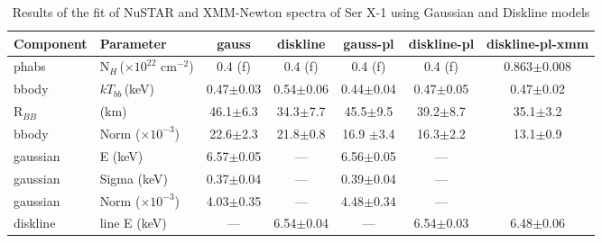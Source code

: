 \documentclass{aa}
\begin{document}
\begin{table*}
\caption{Results of the fit of NuSTAR and XMM-Newton spectra of Ser X-1 using Gaussian and Diskline models \label{tab:fit_1}}             
  
  
    
\centering          
\scriptsize


\begin{tabular}{llccccc}     %
\hline\hline       

Component &
Parameter &



gauss &
diskline&
gauss-pl &
diskline-pl &
diskline-pl-xmm\\





\hline
phabs & 
N$_{H}\,$($\times10^{22}$ cm$^{-2}$) & 
0.4 (f) &
0.4 (f) &
0.4 (f) &
0.4 (f) &
0.863$\pm$0.008  \\




bbody & 
$kT_{bb}\,$(keV) & 
0.47$\pm$0.03 &
0.54$\pm$0.06  & 
0.44$\pm$0.04 &
0.47$\pm$0.05 & 
0.47$\pm$0.02\\

R$_{BB}$&
 (km)  &  
46.1$\pm$6.3 &
34.3$\pm$7.7&
45.5$\pm$9.5 &
39.2$\pm$8.7 &
35.1$\pm$3.2 \\


bbody & 
Norm ($\times10^{-3}$) &  
22.6$\pm$2.3 &
21.8$\pm$0.8 &
16.9 $\pm$3.4 &
16.3$\pm$2.2 &
13.1$\pm$0.9\\


\hline


gaussian & 
E (keV)   & 
6.57$\pm$0.05 &
--- &
6.56$\pm$0.05 &
--- \\


gaussian & 
Sigma (keV)   & 
0.37$\pm$0.04&
--- &
0.39$\pm$0.04 & 
--- \\

gaussian & 
Norm ($\times10^{-3}$)   & 
4.03$\pm$0.35&
--- &
4.48$\pm$0.34 &
--- \\




\hline

 

diskline &
line E (keV)   &
---& 
6.54$\pm$0.04 &
---&
6.54$\pm$0.03&
6.48$\pm$0.06 \\




\end{tabular}
\end{table*}
\end{document}
